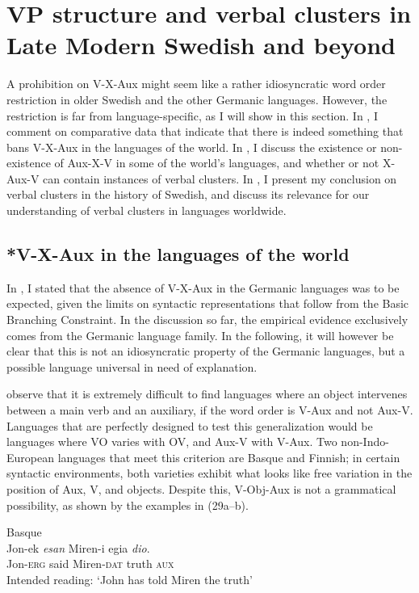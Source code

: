 \documentclass[output=paper, colorlinks, citecolor=brown]{langscibook}
\begin{document}
\section{VP structure and verbal clusters in Late Modern Swedish and beyond}\label{sec:sangfelt:5}

A prohibition on V-X-Aux might seem like a rather idiosyncratic word order restriction in older Swedish and the other Germanic languages. However, the restriction is far from language-specific, as I will show in this section. In , I comment on comparative data that indicate that there is indeed something that bans V-X-Aux in the languages of the world. In , I discuss the existence or non-existence of Aux-X-V in some of the world’s languages, and whether or not X-Aux-V can contain instances of verbal clusters. In , I present my conclusion on verbal clusters in the history of Swedish, and discuss its relevance for our understanding of verbal clusters in languages worldwide.

\subsection{*V-X-Aux in the languages of the world}\label{sec:sangfelt:5.1}

In , I stated that the absence of V-X-Aux in the Germanic languages was to be expected, given the limits on syntactic representations that follow from the Basic Branching Constraint. In the discussion so far, the empirical evidence exclusively comes from the Germanic language family. In the following, it will however be clear that this is not an idiosyncratic property of the Germanic languages, but a possible language universal in need of explanation.


\citet{BiberauerEtAl2014} observe that it is extremely difficult to find languages where an object intervenes between a main verb and an auxiliary, if the word order is V-Aux and not Aux-V. Languages that are perfectly designed to test this generalization would be languages where VO varies with OV, and Aux-V with V-Aux. Two non-Indo-European languages that meet this criterion are Basque and Finnish; in certain syntactic environments, both varieties exhibit what looks like free variation in the position of Aux, V, and objects. Despite this, V-Obj-Aux is not a grammatical possibility, as shown by the examples in (29a–b).


\ea
\label{ex:sangfelt:29}
\ea Basque\label{ex:sangfelt:29a}\\
\gll * Jon-ek \textit{esan} {Miren-i} {egia} \textit{dio}. \\
 {} Jon-\textsc{erg} said Miren-\textsc{dat} truth \textsc{aux}\\
\glt Intended reading: ‘John has told Miren the truth’
\end{document}
